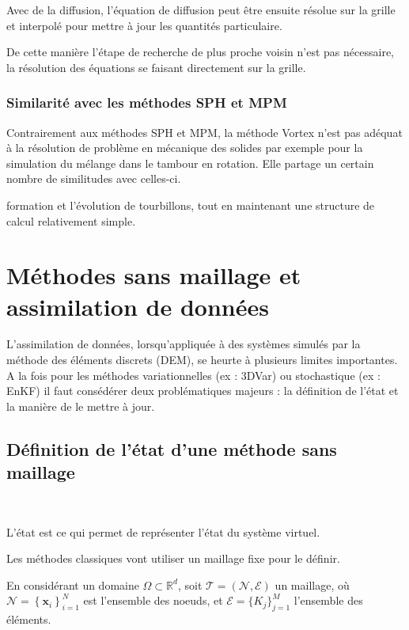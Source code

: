 Avec de la diffusion, l'équation de diffusion peut être ensuite résolue sur la grille et interpolé pour mettre à jour les quantités particulaire.

De cette manière l'étape de recherche de plus proche voisin n'est pas nécessaire, la résolution des équations se faisant directement sur la grille.

\subsubsection{Similarité avec les méthodes SPH et MPM}

Contrairement aux méthodes SPH et MPM, la méthode Vortex n'est pas adéquat à la résolution de problème en mécanique des solides par exemple pour la simulation du mélange dans le tambour en rotation. Elle partage un certain nombre de similitudes avec celles-ci.


formation et l'évolution de tourbillons, tout en maintenant une structure de calcul relativement simple.

\section{Méthodes sans maillage et assimilation de données}

L'assimilation de données, lorsqu'appliquée à des systèmes simulés par la méthode des éléments discrets (DEM), se heurte à plusieurs limites importantes. A la fois pour les méthodes variationnelles (ex : 3DVar) ou stochastique (ex : EnKF) il faut consédérer deux problématiques majeurs : la définition de l'état et la manière de le mettre à jour.

\subsection{Définition de l'état d'une méthode sans maillage}~\label{sec:etat_meshless}

L'état est ce qui permet de représenter l'état du système virtuel.

Les méthodes classiques vont utiliser un maillage fixe pour le définir.

En considérant un domaine $\Omega \subset \mathbb R^d$, soit $\mathcal{T} = (\mathcal N, \mathcal E)$ un maillage, où $\mathcal N = \left\{\bm x_i \right\}^N_{i=1}$ est l'ensemble des noeuds, et $\mathcal{E} = \{ K_j \}_{j=1}^{M}$ l'ensemble des éléments.

